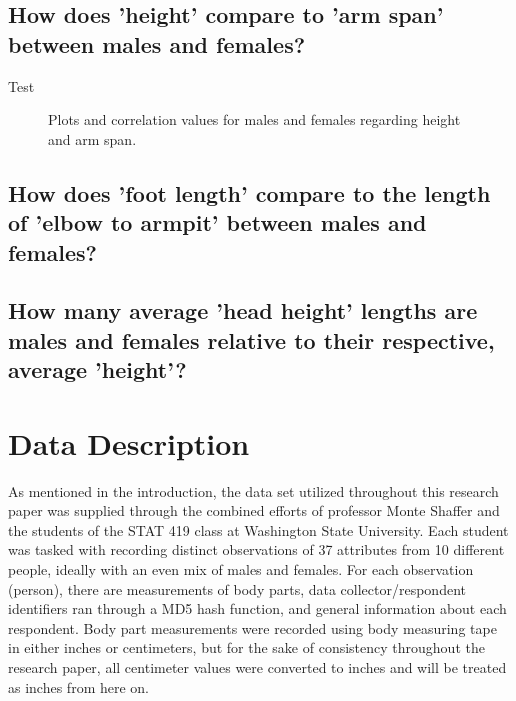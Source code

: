 \documentclass[]{article}
\begin{document}
\subsection{How does 'height' compare to 'arm span' between males and females?}
\label{sec:rq2}

Test

\begin{figure}[!ht]
    \begin{center}
        \caption{Plots and correlation values for males and females regarding height and arm span.}
    \end{center}
    \label{fig:sq1}
\end{figure}

\subsection{How does 'foot length' compare to the length of 'elbow to armpit' between males and females?}
\label{sec:rq3}

\subsection{How many average 'head height' lengths are males and females relative to their respective, average 'height'?}
\label{sec:rq4}

\section{Data Description}
\label{sec:data}

As mentioned in the introduction, the data set utilized throughout this
research paper was supplied through the combined efforts of professor
Monte Shaffer and the students of the STAT 419 class at Washington State
University. Each student was tasked with recording distinct observations
of 37 attributes from 10 different people, ideally with an even mix of
males and females. For each observation (person), there are measurements
of body parts, data collector/respondent identifiers ran through a MD5
hash function, and general information about each respondent. Body part
measurements were recorded using body measuring tape in either inches or
centimeters, but for the sake of consistency throughout the research
paper, all centimeter values were converted to inches and will be
treated as inches from here on.
\end{document}
